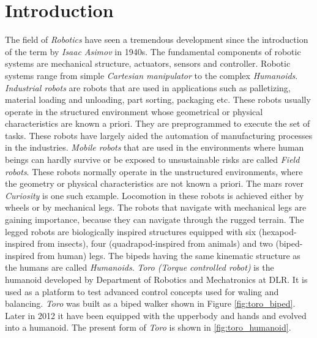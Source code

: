 \chapter{Introduction}
\label{sec:einleitung}
The field of \emph{Robotics} have seen a tremendous development since the introduction of the term by \emph{Isaac Asimov} in 1940s. The fundamental components of robotic systems are mechanical structure, actuators, sensors and controller. Robotic systems range from simple \emph{Cartesian manipulator} to the complex \emph{Humanoids}. \emph{Industrial robots} are robots that are used in applications such as palletizing, material loading and unloading, part sorting, packaging etc. These robots usually operate in the structured environment whose geometrical or physical characteristics are known a priori. They are preprogrammed to execute the set of tasks. These robots have largely aided the automation of manufacturing processes in the industries. \emph{Mobile robots} that are used in the environments where human beings can hardly survive or be exposed to unsustainable risks are called \emph{Field robots}. These robots normally operate in the unstructured environments, where the geometry or physical characteristics are not known a priori. The mars rover \emph{Curiosity} is one such example. Locomotion in these robots is achieved either by wheels or by mechanical legs. The robots that navigate with mechanical legs are gaining importance, because they can navigate through the rugged terrain. The legged robots are biologically inspired structures equipped with six (hexapod-inspired from insects), four (quadrapod-inspired from animals) and two (biped-inspired from human) legs. The bipeds having the same kinematic structure as the humans are called \emph{Humanoids}. \emph{Toro (Torque controlled robot)} is the humanoid developed by Department of Robotics and Mechatronics at DLR. It is used as a platform to test advanced control concepts used for waling and balancing. \emph{Toro} was built as a biped walker shown in Figure \ref{fig:toro_biped}. Later in 2012 it have been equipped with the upperbody and hands and evolved into a humanoid. The present form of \emph{Toro} is shown in \ref{fig:toro_humanoid}.
